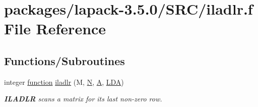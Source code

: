 \hypertarget{iladlr_8f}{}\section{packages/lapack-\/3.5.0/\+S\+R\+C/iladlr.f File Reference}
\label{iladlr_8f}
\subsection*{Functions/\+Subroutines}
\begin{DoxyCompactItemize}
\item 
integer \hyperlink{afunc_8m_a7b5e596df91eadea6c537c0825e894a7}{function} \hyperlink{group__auxOTHERauxiliary_gac0eeaff271e43cd10d066ef1cceb5f3b}{iladlr} (M, \hyperlink{polmisc_8c_a0240ac851181b84ac374872dc5434ee4}{N}, \hyperlink{classA}{A}, \hyperlink{example__user_8c_ae946da542ce0db94dced19b2ecefd1aa}{L\+D\+A})
\begin{DoxyCompactList}\small\item\em {\bfseries I\+L\+A\+D\+L\+R} scans a matrix for its last non-\/zero row. \end{DoxyCompactList}\end{DoxyCompactItemize}
